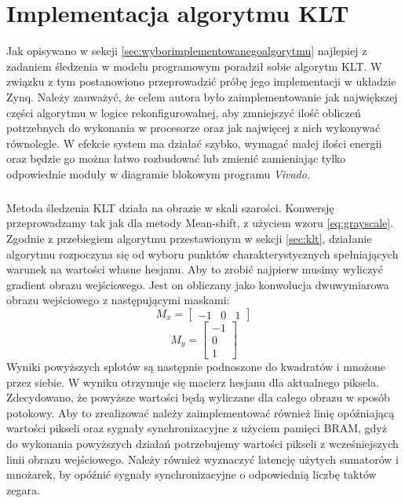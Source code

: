 \chapter{Implementacja algorytmu KLT}
\label{cha:implementacjaalgorytmuklt}

Jak opisywano w sekcji \ref{sec:wyborimplementowanegoalgorytmu} najlepiej z zadaniem śledzenia w modelu programowym poradził sobie algorytm KLT. W związku z tym postanowiono przeprowadzić próbę jego implementacji w układzie Zynq. Należy zauważyć, że celem autora było zaimplementowanie jak największej części algorytmu w logice rekonfigurowalnej, aby zmniejszyć ilość obliczeń potrzebnych do wykonania w procesorze oraz jak najwięcej z nich wykonywać równolegle. W efekcie system ma działać szybko, wymagać małej ilości energii oraz będzie go można łatwo rozbudować lub zmienić zamieniając tylko odpowiednie moduły w diagramie blokowym programu \textit{Vivado}.

\paragraph*{}
Metoda śledzenia KLT działa na obrazie w skali szarości. Konwersję przeprowadzamy tak jak dla metody Mean-shift, z użyciem wzoru \ref{eq:grayscale}. Zgodnie z przebiegiem algorytmu przestawionym w sekcji \ref{sec:klt}, działanie algorytmu rozpoczyna się od wyboru punktów charakterystycznych spełniających warunek na wartości własne hesjanu. Aby to zrobić najpierw musimy wyliczyć gradient obrazu wejściowego. Jest on obliczany jako konwolucja dwuwymiarowa obrazu wejściowego z następującymi maskami:
\begin{equation}
M_x=
	\begin{bmatrix}
	-1 & 0 & 1
	\end{bmatrix}
\end{equation}
\begin{equation}
M_y=
	\begin{bmatrix}
	-1 \\
	0 \\
	1
	\end{bmatrix}
\end{equation}
Wyniki powyższych splotów są następnie podnoszone do kwadratów i mnożone przez siebie. W wyniku otrzymuje się macierz hesjanu dla aktualnego piksela. Zdecydowano, że powyższe wartości będą wyliczane dla całego obrazu w sposób potokowy. Aby to zrealizować należy zaimplementować również linię opóźniającą wartości pikseli oraz sygnały synchronizacyjne z użyciem pamięci BRAM, gdyż do wykonania powyższych działań potrzebujemy wartości pikseli z wcześniejszych linii obrazu wejściowego. Należy również wyznaczyć latencję użytych sumatorów i mnożarek, by opóźnić sygnały synchronizacyjne o odpowiednią liczbę taktów zegara.

